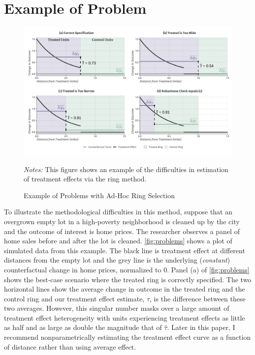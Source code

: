 \documentclass[12pt]{article}
\begin{document}
\section{Example of Problem}\label{sec:example}


\begin{figure}[tb]
  \caption{Example of Problems with Ad-Hoc Ring Selection}
  \label{fig:problems}

  \begin{adjustbox}{width = 1.1\textwidth, center}
      \includegraphics[width=\textwidth]{../../figures/example.pdf}
  \end{adjustbox}

  {\footnotesize \emph{Notes:} This figure shows an example of the difficulties in estimation of treatment effects via the ring method.}
\end{figure}

To illustrate the methodological difficulties in this method, suppose that an overgrown empty lot in a high-poverty neighborhood is cleaned up by the city and the outcome of interest is home prices. The researcher observes a panel of home sales before and after the lot is cleaned. \autoref{fig:problems} shows a plot of simulated data from this example. The black line is treatment effect at different distances from the empty lot and the grey line is the underlying (\emph{constant}) counterfactual change in home prices, normalized to 0. Panel (a) of \autoref{fig:problems} shows the best-case scenario where the treated ring is correctly specified. The two horizontal lines show the average change in outcome in the treated ring and the control ring and our treatment effect estimate, $\hat{\tau}$, is the difference between these two averages. However, this singular number masks over a large amount of treatment effect heterogeneity with units experiencing treatment effects as little as half and as large as double the magnitude that of $\hat{\tau}$. Later in this paper, I recommend nonparametrically estimating the treatment effect curve as a function of distance rather than using average effect. 
\end{document}
